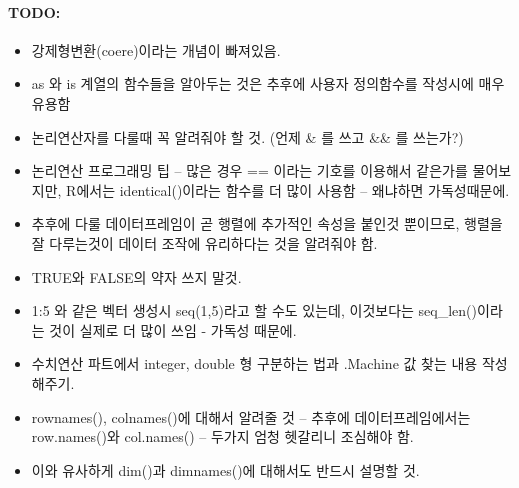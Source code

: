 \documentclass[tutorial.tex]{subfiles}
\begin{document}
\paragraph{TODO:}
\begin{itemize}
	\item 강제형변환(coere)이라는 개념이 빠져있음. 
	\item as 와 is 계열의 함수들을 알아두는 것은 추후에 사용자 정의함수를 작성시에 매우 유용함 
	\item 논리연산자를 다룰때 꼭 알려줘야 할 것. (언제 \& 를 쓰고 \&\& 를 쓰는가?)
	\item 논리연산 프로그래밍 팁 -- 많은 경우 == 이라는 기호를 이용해서 같은가를 물어보지만, R에서는 identical()이라는 함수를 더 많이 사용함 -- 왜냐하면 가독성때문에.  
	\item 추후에 다룰 데이터프레임이 곧 행렬에 추가적인 속성을 붙인것 뿐이므로, 행렬을 잘 다루는것이 데이터 조작에 유리하다는 것을 알려줘야 함.
	\item TRUE와 FALSE의 약자 쓰지 말것.
	\item 1:5 와 같은 벡터 생성시 seq(1,5)라고 할 수도 있는데, 이것보다는 seq\_len()이라는 것이 실제로 더 많이 쓰임 - 가독성 때문에.
	\item 수치연산 파트에서 integer, double 형 구분하는 법과 .Machine 값 찾는 내용 작성해주기. 
	\item rownames(), colnames()에 대해서 알려줄 것 -- 추후에 데이터프레임에서는 row.names()와 col.names() -- 두가지 엄청 헷갈리니 조심해야 함. 
	\item 이와 유사하게 dim()과 dimnames()에 대해서도 반드시 설명할 것. 
\end{itemize}
\end{document}
